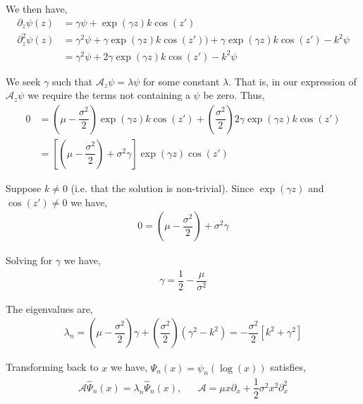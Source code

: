\begin{solution}[Solution]
We then have,
\begin{align*}
    \partial_z \psi(z) &= \gamma \psi + \exp(\gamma z) k \cos(z') \\
    \partial_z^2 \psi(z) &= \gamma^2 \psi + \gamma \exp(\gamma z) k \cos(z'))
    + \gamma \exp(\gamma z) k \cos(z') - k^2\psi
    \\&= \gamma^2 \psi + 2 \gamma \exp(\gamma z) k \cos(z') - k^2\psi
\end{align*}

We seek \( \gamma \) such that \( \mathcal{A}_z \psi = \lambda \psi \) for some constant \( \lambda \). That is, in our expression of \( \mathcal{A}_z\psi \) we require the terms not containing a \( \psi \) be zero.
Thus,
\begin{align*}
    0 &= \left( \mu - \dfrac{\sigma^2}{2} \right) \exp(\gamma z) k \cos(z') + \left( \dfrac{\sigma^2}{2} \right)2\gamma\exp(\gamma z) k \cos(z') 
    \\&= \left[ \left( \mu - \dfrac{\sigma^2}{2} \right) + \sigma^2 \gamma \right]\exp(\gamma z)\cos(z')
\end{align*}

Suppose \( k\neq 0 \) (i.e. that the solution is non-trivial). Since \( \exp(\gamma z) \) and \( \cos(z')\neq 0 \) we have,
\begin{align*}
    0 = \left( \mu - \dfrac{\sigma^2}{2} \right) + \sigma^2\gamma
\end{align*}

Solving for \( \gamma \) we have,
\begin{align*}
    \gamma = \dfrac{1}{2} - \dfrac{\mu}{\sigma^2}
\end{align*}

The eigenvalues are,
\begin{align*}
    \lambda_n
    = \left( \mu - \dfrac{\sigma^2}{2} \right)\gamma + \left( \dfrac{\sigma^2}{2} \right) \left( \gamma^2 - k^2 \right) = -\dfrac{\sigma^2}{2}[k^2+\gamma^2]
\end{align*}
\iffalse
=-\frac{\pi ^2 n^2 \sigma ^2}{2 (\log (l)-\log (r))^2}-\frac{\left(\sigma ^2-2 \mu \right)^2}{8 \sigma ^2}
    = - \dfrac{\sigma^2}{2}[k^2+\gamma^2]
\fi

Transforming back to \( x \) we have, \( \hat{\Psi}_n(x) = \psi_n(\log(x))  \) satisfies,
\begin{align*}
    \mathcal{A} \hat{\Psi}_n(x) = \lambda_n \hat{\Psi}_n(x), && \mathcal{A}  = \mu x \partial_x + \dfrac{1}{2}\sigma^2 x^2 \partial_x^2
\end{align*}


\end{solution}
